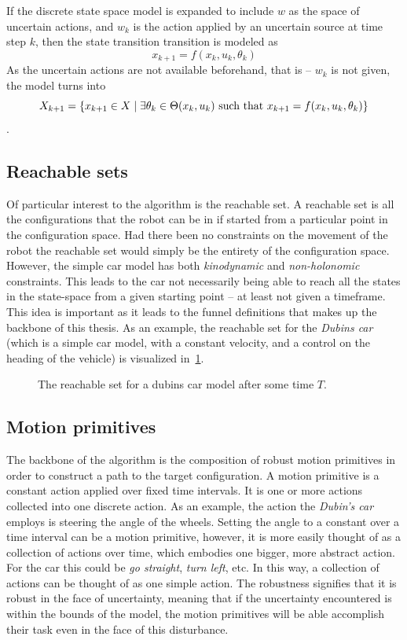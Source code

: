 If the discrete state space model is expanded to include \(w\) as the space of
uncertain actions, and \(w_k\) is the action applied by an uncertain source at
time step \(k\), then the state transition transition is modeled as
\[
  x_{k+1} = f(x_k,u_k,\theta_k)
\]
As the uncertain actions are not available beforehand, that is -- \(w_ k\) is
not given, the model turns into
\[
  X_{k+1} = \lbrace x_{k+1} \in X \mid \exists\theta_k \in \Theta(x_k,u_k) \text{
      such that } x_{k+1} = f(x_k,u_k,\theta_k)\rbrace
\] \cite{Lav06}.

\subsection{Reachable sets}
\label{subsec:reachable-set}

Of particular interest to the \rrtfunnel{} algorithm is the reachable set. A
reachable set is all the configurations that the robot can be in if started from
a particular point in the configuration space. Had there been no constraints on
the movement of the robot the reachable set would simply be the entirety of the
configuration space. However, the simple car model has both \textit{kinodynamic}
and \textit{non-holonomic} constraints. This leads to the car not necessarily
being able to reach all the states in the state-space from a given starting
point -- at least not given a timeframe. This idea is important as it leads to
the funnel definitions that makes up the backbone of this thesis. As an example,
the reachable set for the \textit{Dubins car} (which is a simple car model, with
a constant velocity, and a control on the heading of the vehicle) is visualized
in~\cref{fig:reachable-set-dubin}.

\begin{figure}
  \centering 
  \caption{The reachable set for a dubins car model after some time \(T\).}
  \label{fig:reachable-set-dubin}
\end{figure}

\subsection{Motion primitives}

The backbone of the \rrtfunnel{} algorithm is the composition of robust motion
primitives in order to construct a path to the target configuration. A motion
primitive is a constant action applied over fixed time intervals. It is one or
more actions collected into one discrete action. As an example, the action the
\textit{Dubin's car} employs is steering the angle of the wheels. Setting the
angle to a constant over a time interval can be a motion primitive, however, it
is more easily thought of as a collection of actions over time, which embodies
one bigger, more abstract action. For the car this could be \textit{go
  straight}, \textit{turn left}, etc. In this way, a collection of actions can
be thought of as one simple action. The robustness signifies that it is robust
in the face of uncertainty, meaning that if the uncertainty encountered is
within the bounds of the model, the motion primitives will be able accomplish
their task even in the face of this disturbance.

